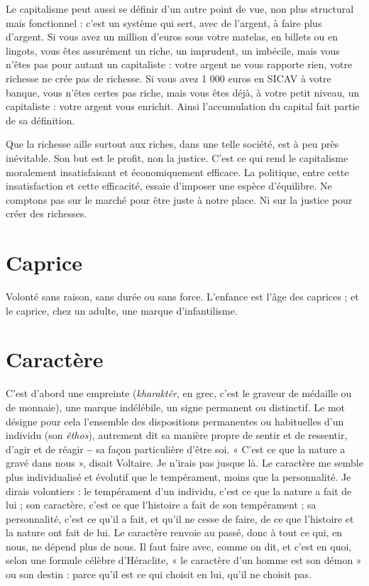 Le capitalisme peut aussi se définir d’un autre point de vue, non plus structural
mais fonctionnel : c’est un système qui sert, avec de l'argent, à faire plus d’argent.
Si vous avez un million d’euros sous votre matelas, en billets ou en lingots, vous
êtes assurément un riche, un imprudent, un imbécile, mais vous n’êtes pas pour
autant un capitaliste : votre argent ne vous rapporte rien, votre richesse ne crée pas
de richesse. Si vous avez 1 000 euros en SICAV à votre banque, vous n'êtes certes
pas riche, mais vous êtes déjà, à votre petit niveau, un capitaliste : votre argent vous
enrichit. Ainsi l’accumulation du capital fait partie de sa définition.

Que la richesse aille surtout aux riches, dans une telle société, est à peu près
inévitable. Son but est le profit, non la justice. C’est ce qui rend le capitalisme
moralement insatisfaisant et économiquement efficace. La politique, entre cette
insatisfaction et cette efficacité, essaie d’imposer une espèce d'équilibre. Ne
comptons pas sur le marché pour être juste à notre place. Ni sur la justice pour
créer des richesses.

\section{Caprice}
Volonté sans raison, sans durée ou sans force. L'enfance est l’âge
des caprices ; et le caprice, chez un adulte, une marque d’infantilisme.

\section{Caractère}
C’est d’abord une empreinte ({\it kharaktêr}, en grec, c’est le graveur
de médaille ou de monnaie), une marque indélébile, un
signe permanent ou distinctif. Le mot désigne pour cela l’ensemble des dispositions
permanentes ou habituelles d’un individu (son {\it êthos}), autrement
dit sa manière propre de sentir et de ressentir, d’agir et de réagir {\bf --} sa façon
particulière d’être soi. « C’est ce que la nature a gravé dans nous », disait
Voltaire. Je n’irais pas jusque là. Le caractère me semble plus individualisé
et évolutif que le tempérament, moins que la personnalité. Je dirais
volontiers : le tempérament d’un individu, c’est ce que la nature a fait de
lui ; son caractère, c’est ce que l’histoire a fait de son tempérament ; sa personnalité,
c’est ce qu’il a fait, et qu’il ne cesse de faire, de ce que l’histoire et
la nature ont fait de lui. Le caractère renvoie au passé, donc à tout ce qui, en
nous, ne dépend plus de nous. Il faut faire avec, comme on dit, et c’est en
quoi, selon une formule célèbre d'Héraclite, « le caractère d’un homme est
son démon » ou son destin : parce qu’il est ce qui choisit en lui, qu’il ne
choisit pas.

